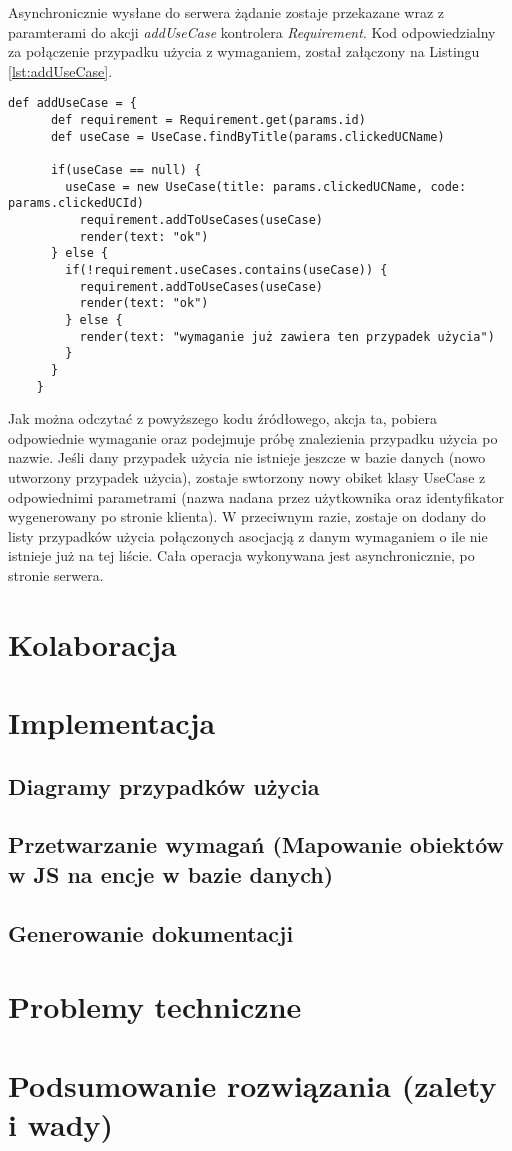     Asynchronicznie wysłane do serwera żądanie zostaje przekazane wraz z paramterami do akcji \emph{addUseCase} kontrolera \emph{Requirement}. Kod odpowiedzialny za połączenie przypadku użycia z wymaganiem, został załączony na Listingu \ref{lst:addUseCase}.

    \begin{lstlisting}[caption={addUseCase}, label={lst:addUseCase}]
    def addUseCase = {
      def requirement = Requirement.get(params.id)
      def useCase = UseCase.findByTitle(params.clickedUCName)

      if(useCase == null) {
        useCase = new UseCase(title: params.clickedUCName, code: params.clickedUCId)
          requirement.addToUseCases(useCase)
          render(text: "ok")
      } else {
        if(!requirement.useCases.contains(useCase)) {
          requirement.addToUseCases(useCase)
          render(text: "ok")
        } else {
          render(text: "wymaganie już zawiera ten przypadek użycia")
        }
      }
    }
    \end{lstlisting}

    Jak można odczytać z powyższego kodu źródłowego, akcja ta, pobiera odpowiednie wymaganie oraz podejmuje próbę znalezienia przypadku użycia po nazwie. Jeśli dany przypadek użycia nie istnieje jeszcze w bazie danych (nowo utworzony przypadek użycia), zostaje swtorzony nowy obiket klasy UseCase z odpowiednimi parametrami (nazwa nadana przez użytkownika oraz identyfikator wygenerowany po stronie klienta). W przeciwnym razie, zostaje on dodany do listy przypadków użycia połączonych asocjacją z danym wymaganiem o ile nie istnieje już na tej liście. Cała operacja wykonywana jest asynchronicznie, po stronie serwera. 

  \section{Kolaboracja}
  
  \section{Implementacja}

    \subsection{Diagramy przypadków użycia}
    \subsection{Przetwarzanie wymagań (Mapowanie obiektów w JS na encje w bazie danych)}
    \subsection{Generowanie dokumentacji}

  \section{Problemy techniczne}
  \section{Podsumowanie rozwiązania (zalety i wady)}

